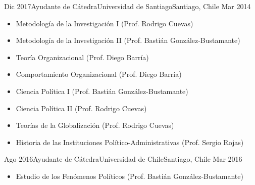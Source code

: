 \begin{experiences}
  \emptySeparator 
  \experience 
    {Dic 2017}{Ayudante de Cátedra}{Universidad de Santiago}{Santiago, Chile} {Mar 2014}
    {\begin{itemize}
    \item Metodología de la Investigación I {\small (Prof. Rodrigo Cuevas)}
    \item Metodología de la Investigación II {\small (Prof. Bastián González-Bustamante)}
    \item Teoría Organizacional {\small (Prof. Diego Barría)}
    \item Comportamiento Organizacional {\small (Prof. Diego Barría)}
    \item Ciencia Política I {\small (Prof. Bastián González-Bustamante)}
    \item Ciencia Política II {\small (Prof. Rodrigo Cuevas)}
	\item Teorías de la Globalización {\small (Prof. Rodrigo Cuevas)}
	\item Historia de las Instituciones Político-Administrativas {\small (Prof. Sergio Rojas)}
    \end{itemize}}
    {}
\end{experiences}
\vspace{-2mm}

\begin{experiences}
  \emptySeparator 
  \experience 
    {Ago 2016}{Ayudante de Cátedra}{Universidad de Chile}{Santiago, Chile} {Mar 2016}
    {\begin{itemize}
    \item Estudio de los Fenómenos Políticos {\small (Prof. Bastián González-Bustamante)}
    \end{itemize}}
    {}
\end{experiences}
